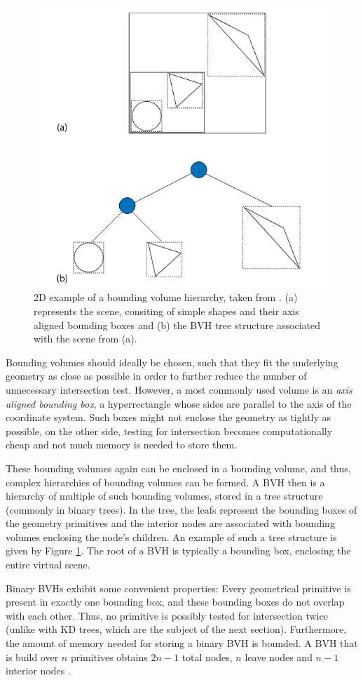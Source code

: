 \begin{figure}
	\centering
	\includegraphics[width=.7\linewidth]{img/1 fundamentals/bvh.png}
	\caption{2D example of a bounding volume hierarchy, taken from \cite{pharr2016physically}. (a) represents the scene, consiting of simple shapes and their axis aligned bounding boxes and (b) the BVH tree structure associated with the scene from (a).}
	\label{fig:bvh}
\end{figure}

Bounding volumes should ideally be chosen, such that they fit the underlying geometry as close as possible in order to further reduce the number of unnecessary intersection test. However, a most commonly used volume is an \emph{axis aligned bounding box}, a hyperrectangle whose sides are parallel to the axis of the coordinate system. Such boxes might not enclose the geometry as tightly as possible, on the other side, testing for intersection becomes computationally cheap and not much memory is needed to store them.

These bounding volumes again can be enclosed in a bounding volume, and thus, complex hierarchies of bounding volumes can be formed.
A BVH then is a hierarchy of multiple of such bounding volumes, stored in a tree structure (commonly in binary trees). In the tree, the leafs represent the bounding boxes of the geometry primitives and the interior nodes are associated with bounding volumes enclosing the node's children. An example of such a tree structure is given by Figure \ref{fig:bvh}. The root of a BVH is typically a bounding box, enclosing the entire virtual scene.

Binary BVHs exhibit some convenient properties:  Every geometrical primitive is present in exactly one bounding box, and these bounding boxes do not overlap with each other. Thus, no primitive is possibly tested for intersection twice (unlike with KD trees, which are the subject of the next section). Furthermore, the amount of memory needed for storing a binary BVH is bounded. A BVH that is build over $n$ primitives obtains $2n-1$ total nodes, $n$ leave nodes and $n-1$ interior nodes \cite{pharr2016physically}. 

